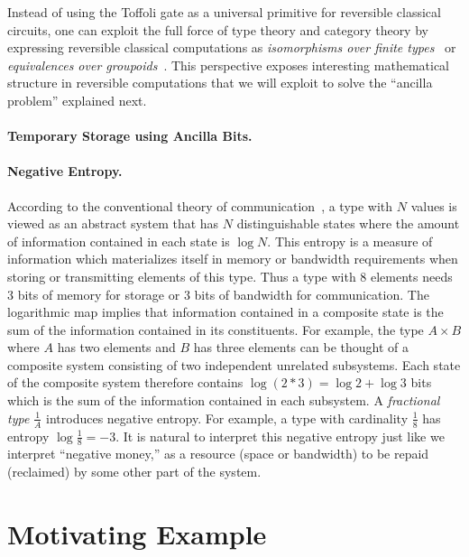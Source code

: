 \documentclass[sigplan,10pt,review,anonymous]{acmart}
\begin{document}
Instead of using the Toffoli gate as a universal primitive for
reversible classical circuits, one can exploit the full force of type
theory and category theory by expressing reversible classical
computations as \emph{isomorphisms over finite
  types}~\cite{Fiore:2004,James:2012:IE:2103656.2103667} or
\emph{equivalences over
  groupoids}~\cite{DBLP:conf/esop/CaretteS16}. This perspective
exposes interesting mathematical structure in reversible computations
that we will exploit to solve the ``ancilla problem'' explained next. 

\paragraph*{Temporary Storage using Ancilla Bits.}

\paragraph*{Negative Entropy.}  
According to the conventional theory of
communication~\cite{Shannon1948}, a type with $N$ values is viewed as
an abstract system that has $N$ distinguishable states where the
amount of information contained in each state is $\log{N}$. This
entropy is a measure of information which materializes itself in
memory or bandwidth requirements when storing or transmitting elements
of this type. Thus a type with 8 elements needs 3 bits of memory for
storage or 3 bits of bandwidth for communication. The logarithmic map
implies that information contained in a composite state is the sum of
the information contained in its constituents. For example, the type
$A \times B$ where $A$ has two elements and $B$ has three elements can
be thought of a composite system consisting of two independent
unrelated subsystems.  Each state of the composite system therefore
contains $\log{(2*3)} = \log{2} + \log{3}$ bits which is the sum of
the information contained in each subsystem. A \emph{fractional type}
$\frac{1}{A}$ introduces negative entropy. For example, a type with
cardinality $\frac{1}{8}$ has entropy $\log{\frac{1}{8}} = -3$. It is
natural to interpret this negative entropy just like we interpret
``negative money,'' as a resource (space or bandwidth) to be repaid
(reclaimed) by some other part of the system.

\section{Motivating Example}
 
\end{document}

